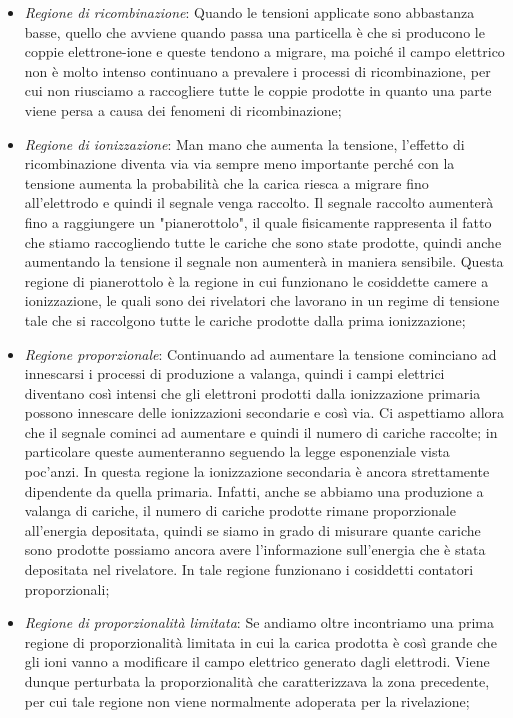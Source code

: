 \begin{itemize}[leftmargin=0.5cm]
   \item \textit{Regione di ricombinazione}: Quando le tensioni applicate sono abbastanza basse, quello che avviene quando passa una particella è che si producono le coppie elettrone-ione e queste tendono a migrare, ma poiché il campo elettrico non è molto intenso continuano a prevalere i processi di ricombinazione, per cui non riusciamo a raccogliere tutte le coppie prodotte in quanto una parte viene persa a causa dei fenomeni di ricombinazione;
   \item \textit{Regione di ionizzazione}: Man mano che aumenta la tensione, l'effetto di ricombinazione diventa via via sempre meno importante perché con la tensione aumenta la probabilità che la carica riesca a migrare fino all'elettrodo e quindi il segnale venga raccolto. Il segnale raccolto aumenterà fino a raggiungere un "pianerottolo", il quale fisicamente rappresenta il fatto che stiamo raccogliendo tutte le cariche che sono state prodotte, quindi anche aumentando la tensione il segnale non aumenterà in maniera sensibile. Questa regione di pianerottolo è la regione in cui funzionano le cosiddette camere a ionizzazione, le quali sono dei rivelatori che lavorano in un regime di tensione tale che si raccolgono tutte le cariche prodotte dalla prima ionizzazione;
   \item \textit{Regione proporzionale}: Continuando ad aumentare la tensione cominciano ad innescarsi i processi di produzione a valanga, quindi i campi elettrici diventano così intensi che gli elettroni prodotti dalla ionizzazione primaria possono innescare delle ionizzazioni secondarie e così via. Ci aspettiamo allora che il segnale cominci ad aumentare e quindi il numero di cariche raccolte; in particolare queste aumenteranno seguendo la legge esponenziale vista poc'anzi. In questa regione la ionizzazione secondaria è ancora strettamente dipendente
   da quella primaria. Infatti, anche se abbiamo una produzione a valanga di cariche, il numero di cariche prodotte rimane proporzionale all'energia depositata, quindi se siamo in grado di misurare quante cariche sono prodotte possiamo ancora avere l'informazione sull'energia che è stata depositata nel rivelatore. In tale regione funzionano i cosiddetti contatori proporzionali;
   \item \textit{Regione di proporzionalità limitata}: Se andiamo oltre incontriamo una prima regione di proporzionalità limitata in cui la carica prodotta è così grande che gli ioni vanno a modificare il campo elettrico generato dagli elettrodi. Viene dunque perturbata la proporzionalità che caratterizzava la zona precedente, per cui tale regione non viene normalmente adoperata per la rivelazione;

\end{itemize}
